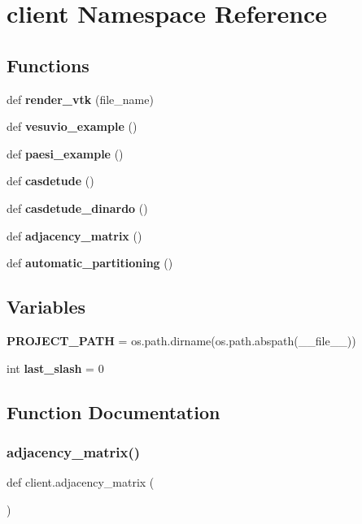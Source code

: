 \section{client Namespace Reference}
\label{namespaceclient}
\subsection*{Functions}
\begin{DoxyCompactItemize}
\item 
def \textbf{ render\+\_\+vtk} (file\+\_\+name)
\item 
def \textbf{ vesuvio\+\_\+example} ()
\item 
def \textbf{ paesi\+\_\+example} ()
\item 
def \textbf{ casdetude} ()
\item 
def \textbf{ casdetude\+\_\+dinardo} ()
\item 
def \textbf{ adjacency\+\_\+matrix} ()
\item 
def \textbf{ automatic\+\_\+partitioning} ()
\end{DoxyCompactItemize}
\subsection*{Variables}
\begin{DoxyCompactItemize}
\item 
\textbf{ P\+R\+O\+J\+E\+C\+T\+\_\+\+P\+A\+TH} = os.\+path.\+dirname(os.\+path.\+abspath(\+\_\+\+\_\+file\+\_\+\+\_\+))
\item 
int \textbf{ last\+\_\+slash} = 0
\end{DoxyCompactItemize}


\subsection{Function Documentation}
\mbox{\label{namespaceclient_ab47128a10fdfd11ed5286a1d75370e4e}} 
\subsubsection{adjacency\+\_\+matrix()}
{\footnotesize\ttfamily def client.\+adjacency\+\_\+matrix (\begin{DoxyParamCaption}{ }\end{DoxyParamCaption})}

